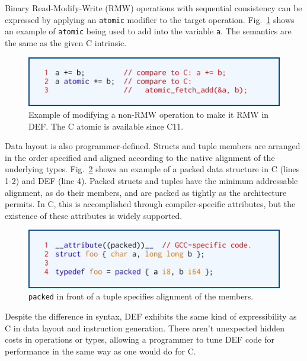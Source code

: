 Binary Read-Modify-Write (RMW) operations with sequential consistency can be expressed by applying an \texttt{atomic} modifier to the target operation.  Fig.~\ref{fig:atomic} shows an example of \texttt{atomic} being used to add into the variable \texttt{a}.  The semantics are the same as the given C intrinsic.

\begin{figure}[htbp!]
        \centering
        \includegraphics[scale=0.25]{gfx/atomic}
        \caption{Example of modifying a non-RMW operation to make it RMW in DEF.  The C atomic is available since C11.}
        \label{fig:atomic}
\end{figure}

Data layout is also programmer-defined.  Structs and tuple members are arranged in the order specified and aligned according to the native alignment of the underlying types.  Fig.~\ref{fig:packed} shows an example of a packed data structure in C (lines 1-2) and DEF (line 4).  Packed structs and tuples have the minimum addressable alignment, as do their members, and are packed as tightly as the architecture permits.  In C, this is accomplished through compiler-specific attributes, but the existence of these attributes is widely supported.

\begin{figure}[htbp!]
        \centering
        \includegraphics[scale=0.25]{gfx/packed}
        \caption{\texttt{packed} in front of a tuple specifies alignment of the members.}
        \label{fig:packed}
\end{figure}

Despite the difference in syntax, DEF exhibits the same kind of expressibility as C in data layout and instruction generation.  There aren't unexpected hidden costs in operations or types, allowing a programmer to tune DEF code for performance in the same way as one would do for C.


